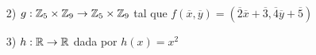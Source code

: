 \documentclass{beamer}
\begin{document}
    \begin{frame}
        \begin{exemplos}
            \begin{enumerate}
                \item[2)] $g : \mathbb{Z}_5 \times \mathbb{Z}_9 \to \mathbb{Z}_5 \times \mathbb{Z}_9$ tal que $f(\overline{x},\overline{y}) = (\overline{2} \overline{x} + \overline{3}, \overline{4}\overline{y} + \overline{5})$
            \end{enumerate}
        \end{exemplos}

        \vspace{5cm}
    \end{frame}

    \begin{frame}
        \vspace{5cm}
    \end{frame}

    \begin{frame}
        \begin{exemplos}
            \begin{enumerate}
                \item[3)] $h :\mathbb{R} \to \mathbb{R}$ dada por $h(x) = x^2$
            \end{enumerate}
        \end{exemplos}

        \vspace{5cm}
    \end{frame}

    \begin{frame}
        \vspace{5cm}
    \end{frame}
\end{document}
